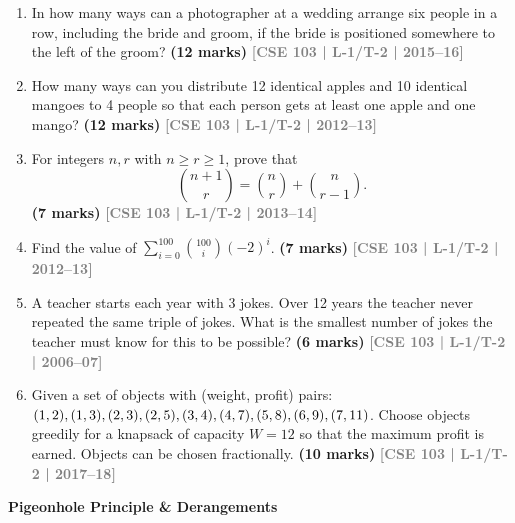 \documentclass[12pt,a3paper]{article}
\newcommand{\yr}[1]{\hfill\textcolor{gray}{\small\textbf{[#1]}}}
\newcommand{\mk}[1]{\textcolor{orange!70!black}{\small\textbf{(#1 marks)}}}
\newcommand{\subtopic}[2]{%
  \vspace{10pt}
  \noindent\begin{tcolorbox}[colback=#1!8,colframe=#1,boxrule=0.6pt,arc=4pt,
    left=6pt,right=6pt,top=4pt,bottom=4pt]
    \small\bfseries\textcolor{#1}{#2}
  \end{tcolorbox}
  \vspace{2pt}
}
\begin{document}
\begin{enumerate}
\item In how many ways can a photographer at a wedding arrange six people in a row, including the bride and groom, if the bride is positioned somewhere to the left of the groom?
\mk{12} \yr{CSE 103 | L-1/T-2 | 2015--16}

\item How many ways can you distribute 12 identical apples and 10 identical mangoes to 4 people so that each person gets at least one apple and one mango?
\mk{12} \yr{CSE 103 | L-1/T-2 | 2012--13}

\item For integers $n, r$ with $n \geq r \geq 1$, prove that
\[
  \binom{n+1}{r} = \binom{n}{r} + \binom{n}{r-1}.
\]
\mk{7} \yr{CSE 103 | L-1/T-2 | 2013--14}  

\item Find the value of $\displaystyle\sum_{i=0}^{100} \binom{100}{i} (-2)^i$.
\mk{7} \yr{CSE 103 | L-1/T-2 | 2012--13}

\item A teacher starts each year with 3 jokes. Over 12 years the teacher never repeated the same triple of jokes. What is the smallest number of jokes the teacher must know for this to be possible?
\mk{6} \yr{CSE 103 | L-1/T-2 | 2006--07}

\item Given a set of objects with (weight, profit) pairs: $(1,2), (1,3), (2,3), (2,5), (3,4), (4,7)\\, (5,8), (6,9), (7,11)$. Choose objects greedily for a knapsack of capacity $W = 12$ so that the maximum profit is earned. Objects can be chosen fractionally.
\mk{10} \yr{CSE 103 | L-1/T-2 | 2017--18}

\end{enumerate}

\subtopic{cC}{Pigeonhole Principle \& Derangements}
\label{sub:s6-pigeonhole}
\end{document}
